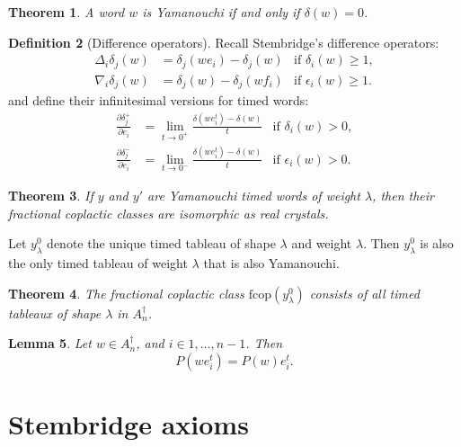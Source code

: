 \documentclass[12pt]{amsproc}
\newcommand{\fcop}{\mathrm{fcop}}
\newtheorem{theorem}{Theorem}
\newtheorem{lemma}[theorem]{Lemma}
\theoremstyle{definition}
\newtheorem{definition}[theorem]{Definition}
\begin{document}
\begin{theorem}
  A word $w$ is Yamanouchi if and only if $\delta(w)=0$.
\end{theorem}
\begin{definition}
  [Difference operators]
  Recall Stembridge's difference operators:
  \begin{align*}
    \Delta_i\delta_j(w) & = \delta_j(we_i)-\delta_j(w) & \text{if } \delta_i(w)\geq 1,\\
    \nabla_i\delta_j(w) & = \delta_j(w)-\delta_j(wf_i) & \text{if } \epsilon_i(w)\geq 1.
  \end{align*}
  and define their infinitesimal versions for timed words:
  \begin{align*}
    \frac{\partial\delta_j^+}{\partial e_i} &= \lim_{t\to 0^+}\frac{\delta(we_i^t)-\delta(w)}t & \text{if } \delta_i(w)>0,\\
    \frac{\partial\delta_j^-}{\partial e_i} &= \lim_{t\to 0^-}\frac{\delta(we_i^t)-\delta(w)}t & \text{if } \epsilon_i(w)>0.
  \end{align*}
\end{definition}
\begin{theorem}
  If $y$ and $y'$ are Yamanouchi timed words of weight $\lambda$, then their fractional coplactic classes are isomorphic as real crystals.
\end{theorem}
Let $y^0_\lambda$ denote the unique timed tableau of shape $\lambda$ and weight $\lambda$.
Then $y^0_\lambda$ is also the only timed tableau of weight $\lambda$ that is also Yamanouchi.
\begin{theorem}
  The fractional coplactic class $\fcop(y^0_\lambda)$ consists of all timed tableaux of shape $\lambda$ in $A_n^\dagger$.
\end{theorem}
\begin{lemma}
  Let $w\in A_n^\dagger$, and $i\in 1,\dotsc, n-1$.
  Then
  \begin{displaymath}
    P(w e_i^t) = P(w) e_i^t.
  \end{displaymath}
\end{lemma}

\section{Stembridge axioms}
\label{sec:stembridge-axioms}
\end{document}
